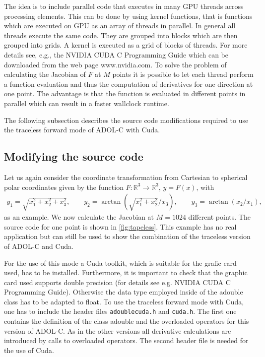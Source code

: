 \documentclass[11pt,twoside]{article}
\begin{document}
The idea is to include parallel code that executes in many GPU threads across
processing elements. This can be done by using kernel functions, that is functions
which are executed on GPU as an array of threads in parallel. In general all 
threads execute the same code. They are grouped into blocks which are then grouped 
into grids. A kernel is executed as a grid of blocks of threads. For more 
details see, e.g., the NVIDIA CUDA C Programming Guide which can be downloaded from 
the web page {\sf www.nvidia.com}. To solve the problem of calculating 
the Jacobian of $F$ at $M$ points it is possible to let each thread perform a 
function evaluation and thus the computation of derivatives for one direction 
at one point. The advantage is that the function is evaluated in different points
in parallel which can result in a faster wallclock runtime.

The following subsection describes the source code modifications required to use 
the traceless forward mode of ADOL-C with Cuda.  

\subsection{Modifying the source code}

Let us again consider the coordinate transformation from Cartesian to spherical
polar coordinates given by the function $F: \mathbb{R}^3 \to \mathbb{R}^3$, $y
= F(x)$, with
\begin{eqnarray*}
y_1  =  \sqrt{x_1^2 + x_2^2 + x_3^2},\qquad
y_2  =  \arctan\left(\sqrt{x_1^2 + x_2^2}/x_3\right),\qquad
y_3  =  \arctan(x_2/x_1),
\end{eqnarray*}
as an example. We now calculate the Jacobian at $M=1024$ different points.
The source code for one point is shown in \autoref{fig:tapeless}. This example 
has no real application but can still be used to show the combination of the traceless version
of ADOL-C and Cuda.

For the use of this mode a Cuda toolkit, which is suitable for the grafic card used,
has to be installed. Furthermore, it is important to check that the graphic card
used supports double precision (for details see e.g. NVIDIA CUDA C Programming Guide).
Otherwise the data type employed inside of the {\sf adouble} class has to be adapted
to {\sf float}. To use the traceless forward mode with Cuda, one has to include the header
files \verb#adoublecuda.h# and \verb#cuda.h#. The first one contains the 
definition of the class {\sf adouble} and the overloaded operators
for this version of ADOL-C. As in the other versions all derivative 
calculations are introduced by calls to overloaded operators. The 
second header file is needed for the use of Cuda.  
\end{document}

